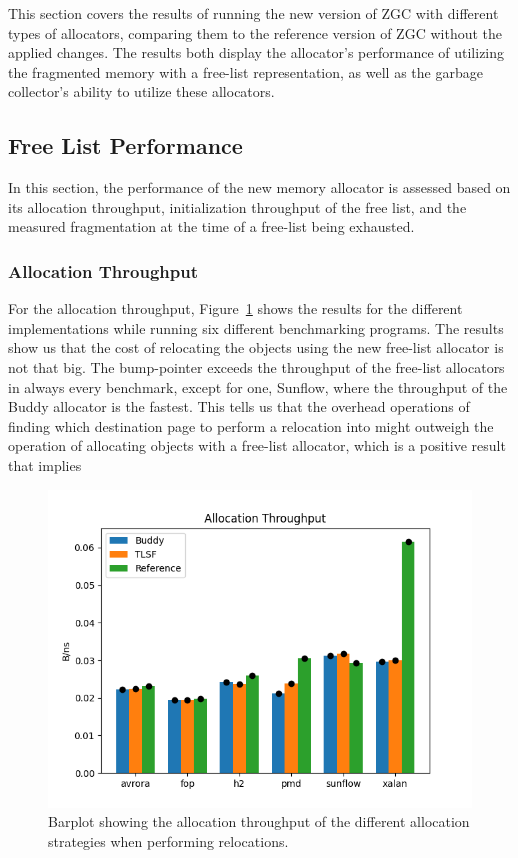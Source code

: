 
This section covers the results of running the new version of ZGC with different types of allocators, comparing them to the reference version of ZGC without the applied changes. The results both display the allocator's performance of utilizing the fragmented memory with a free-list representation, as well as the garbage collector's ability to utilize these allocators.

\subsection{Free List Performance}
In this section, the performance of the new memory allocator is assessed based on its allocation throughput, initialization throughput of the free list, and the measured fragmentation at the time of a free-list being exhausted.

\subsubsection{Allocation Throughput}
For the allocation throughput, Figure~\ref*{fig:allocation-throughput} shows the results for the different implementations while running six different benchmarking programs. The results show us that the cost of relocating the objects using the new free-list allocator is not that big. The bump-pointer exceeds the throughput of the free-list allocators in always every benchmark, except for one, Sunflow, where the throughput of the Buddy allocator is the fastest. This tells us that the overhead operations of finding which destination page to perform a relocation into might outweigh the operation of allocating objects with a free-list allocator, which is a positive result that implies 

\begin{figure}[H]
\centering
\includegraphics[width=1\textwidth]{figures/allocation_throughput2.png}
\caption{Barplot showing the allocation throughput of the different allocation strategies when performing relocations.}
\label{fig:allocation-throughput}
\end{figure}

